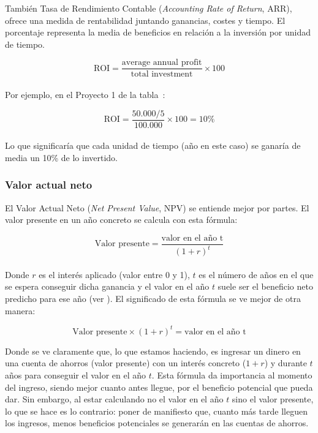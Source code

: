 \documentclass[12pt]{article}
\begin{document}
{También Tasa de Rendimiento Contable (\textit{Accounting Rate of Return}, ARR), ofrece una medida de rentabilidad juntando ganancias, costes y tiempo. El porcentaje representa la media de beneficios en relación a la inversión por unidad de tiempo.}

\begin{equation}
    \text{ROI} = \frac{\text{average annual profit}}{\text{total investment}} \times 100
\end{equation} \\

{Por ejemplo, en el Proyecto 1 de la tabla~:}

\begin{equation}
    \text{ROI} = \frac{50.000/5}{100.000} \times 100 = 10\%
\end{equation} \\

{Lo que significaría que cada unidad de tiempo (año en este caso) se ganaría de media un 10\% de lo invertido.}

\subsubsection{Valor actual neto}
\label{2.5.4}

{El Valor Actual Neto (\textit{Net Present Value}, NPV) se entiende mejor por partes. El valor presente en un año concreto se calcula con esta fórmula:}

\begin{equation}
    \text{Valor presente} = \frac{\text{valor en el año t}}{(1+r)^t}
\end{equation} \\

{Donde $r$ es el interés aplicado (valor entre 0 y 1), $t$ es el número de años en el que se espera conseguir dicha ganancia y el valor en el año $t$ suele ser el beneficio neto predicho para ese año (ver ). El significado de esta fórmula se ve mejor de otra manera:}

\begin{equation}
    \text{Valor presente} \times (1 + r)^t = \text{valor en el año t}
\end{equation}

{Donde se ve claramente que, lo que estamos haciendo, es ingresar un dinero en una cuenta de ahorros (valor presente) con un interés concreto ($1 + r$) y durante $t$ años para conseguir el valor en el año $t$. Esta fórmula da importancia al momento del ingreso, siendo mejor cuanto antes llegue, por el beneficio potencial que pueda dar. Sin embargo, al estar calculando no el valor en el año $t$ sino el valor presente, lo que se hace es lo contrario: poner de manifiesto que, cuanto más tarde lleguen los ingresos, menos beneficios potenciales se generarán en las cuentas de ahorros.} \\
\end{document}
